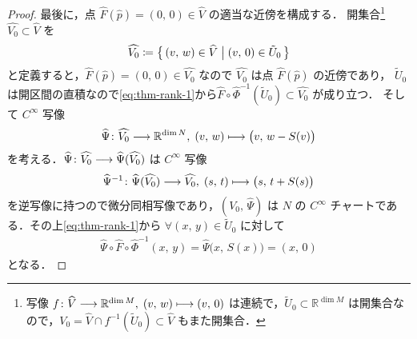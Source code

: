 \documentclass[geometry_main]{subfiles}
\begin{document}
\begin{proof}
    最後に，点 $\widehat{F} (\widehat{p}) = (0,\, 0) \in \widehat{V}$ の適当な近傍を構成する．
    開集合\footnote{写像 $f \colon \widehat{V} \longrightarrow \mathbb{R}^{\dim M},\; (v,\, w) \longmapsto (v,\, 0)$ は連続で，$\tilde{U}_0 \subset \mathbb{R}^{\dim M}$ は開集合なので，$V_0 = \widehat{V} \cap f^{-1}(\tilde{U}_0) \subset \widehat{V}$ もまた開集合．} 
    $\widehat{V_0} \subset \widehat{V}$ を
    \begin{align}
        \widehat{V_0} \coloneqq \bigl\{\, (v,\, w) \in \widehat{V} \bigm| (v,\, 0) \in \tilde{U}_0 \,\bigr\} 
    \end{align}
    と定義すると，$\widehat{F} (\widehat{p}) = (0,\, 0) \in \widehat{V_0}$ なので $\widehat{V_0}$ は点 $\widehat{F} (\widehat{p})$ の近傍であり，
    $\tilde{U}_0$ は開区間の直積なので\eqref{eq:thm-rank-1}から$\widehat{F} \circ \widehat{\Phi}^{-1}(\tilde{U}_0) \subset \widehat{V_0}$ が成り立つ．
    そして $C^\infty$ 写像
    \begin{align}
        \widehat{\Psi} \colon \widehat{V_0} \longrightarrow \mathbb{R}^{\dim N},\; (v,\, w) \longmapsto \bigl( v,\, w - S(v) \bigr) 
    \end{align}
    を考える．$\widehat{\Psi} \colon \widehat{V_0} \longrightarrow \widehat{\Psi}(\widehat{V_0})$ は $C^\infty$ 写像
    \begin{align}
        \widehat{\Psi}^{-1} \colon \widehat{\Psi}(\widehat{V_0}) \longrightarrow \widehat{V_0},\; (s,\, t) \longmapsto \bigl( s,\, t + S(s) \bigr) 
    \end{align}
    を逆写像に持つので微分同相写像であり，$(V_0,\, \widehat{\Psi})$ は $N$ の $C^\infty$ チャートである．その上\eqref{eq:thm-rank-1}から $\forall (x,\, y) \in \tilde{U}_0$ に対して
    \begin{align}
        \label{eq:thm-rank-ans}
        \widehat{\Psi} \circ \widehat{F} \circ \widehat{\Phi}^{-1}(x,\, y) = \widehat{\Psi}\bigl(x,\, S(x)\bigr) = (x,\, 0)
    \end{align}
    となる．


\end{proof}
\end{document}
